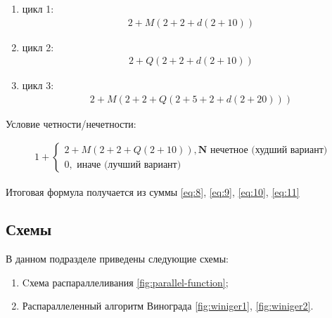 \documentclass[../main.tex]{subfiles}
\begin{document}
	\begin{enumerate}[1)]
		
		\item цикл 1:
		\begin{equation}
		\label{eq:8}
		\boxed{\begin{aligned}
			2 + M(2 + 2 + d(2 + 10))
			\end{aligned}}
		\end{equation}
		
		\item цикл 2:
		\begin{equation}
		\label{eq:9}
		\boxed{\begin{aligned}
			2 + Q(2 + 2 + d(2 + 10))
			\end{aligned}}
		\end{equation}
		
		\item цикл 3:
		\begin{equation}
		\label{eq:10}
		\boxed{\begin{aligned}
			2 + M(2 + 2 +Q(2 + 5+ 2 + d(2 + 20)))
			\end{aligned}}
		\end{equation}
		
	\end{enumerate}

	Условие четности/нечетности:

	\begin{equation}
	\label{eq:11}
	\boxed{\begin{aligned}
		1 + \begin{cases}
		2 + M(2 + 2 + Q(2 + 10)), \textbf{N нечетное (худший вариант)} \\
		0, \textbf{ иначе (лучший вариант)}
		\end{cases}
		\end{aligned}}
	\end{equation}
	
	Итоговая формула получается из суммы \ref{eq:8}, \ref{eq:9}, \ref{eq:10}, \ref{eq:11}
	
\subsection{Схемы}

	В данном подразделе приведены следующие схемы:
	\begin{enumerate}[1)]
		\item Cхема распараллеливания \ref{fig:parallel-function};
		\item Распараллеленный алгоритм Винограда \ref{fig:winiger1}, \ref{fig:winiger2}.
	\end{enumerate}
	
\end{document}
